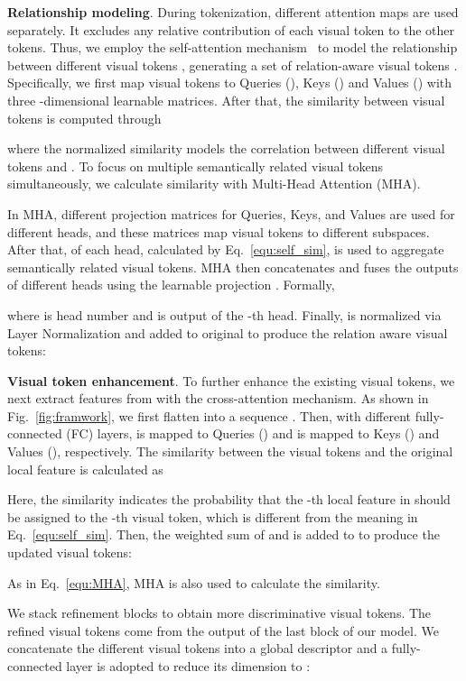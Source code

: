 \documentclass[letterpaper]{article} \usepackage{aaai22}  \usepackage{times}  \usepackage{helvet}  \usepackage{courier}  \usepackage[hyphens]{url}  \usepackage{graphicx} \urlstyle{rm} \def\UrlFont{\rm}  \usepackage{natbib}  \usepackage{caption} \DeclareCaptionStyle{ruled}{labelfont=normalfont,labelsep=colon,strut=off} \frenchspacing  \setlength{\pdfpagewidth}{8.5in}  \setlength{\pdfpageheight}{11in}  \usepackage{algorithm}
\begin{document}
\noindent \textbf{Relationship modeling}. 
During tokenization, different attention maps are used separately. It excludes any relative contribution of each visual token to the other tokens.
Thus, we employ the self-attention mechanism~\cite{tr} to model the relationship between different visual tokens , generating a set of relation-aware visual tokens .
Specifically, we first map visual tokens  to Queries (), 
Keys () and Values () with three -dimensional learnable matrices.
After that, the similarity  between visual tokens is computed through

where the normalized similarity  models the correlation between different visual tokens  and .
To focus on multiple semantically related visual tokens simultaneously, we calculate similarity  with Multi-Head Attention (MHA). 

In MHA, different projection matrices for Queries, Keys, and Values are used for different heads, and these matrices map visual tokens to different subspaces. 
After that,  of each head, calculated by Eq.~\eqref{equ:self_sim}, is used to aggregate semantically related visual tokens. MHA then concatenates and fuses the outputs of different heads using the learnable projection .
Formally,

where  is head number and  is output of the -th head.
Finally,  is normalized via Layer Normalization and added to original  to produce the relation aware visual tokens:


\noindent\textbf{Visual token enhancement}. 
To further enhance the existing visual tokens, we next extract features from  with the cross-attention mechanism.
As shown in Fig.~\ref{fig:framwork}, we first flatten  into a sequence .
Then, with different fully-connected (FC) layers,  is mapped to Queries () and  is mapped to Keys () and Values (), respectively.
The similarity between the visual tokens  and the original local feature  is calculated as

Here, the similarity  indicates the probability that the -th local feature  in  should be assigned to the -th visual token, which is different from the meaning  in Eq.~\eqref{equ:self_sim}.
Then, the weighted sum of  and  is added to  to produce the updated visual tokens:

As in Eq.~\eqref{equ:MHA}, MHA is also used to calculate the similarity.

We stack  refinement blocks to obtain more discriminative visual tokens. 
The refined visual tokens  come from the output of the last block of our model.
We concatenate the different visual tokens  into a global descriptor and 
a fully-connected layer is adopted to reduce its dimension to :
\end{document}
